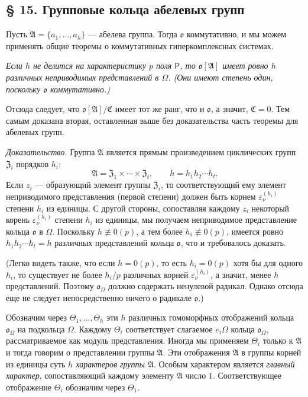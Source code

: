 \documentclass[11pt]{article}
\begin{document}
\subsection*{§ 15. Групповые кольца абелевых групп}\label{die-gruppenringe-abelscher-gruppen}

Пусть \(\mathfrak A=\{a_1,\ldots,a_h\}\) --- абелева группа. Тогда \(\mathfrak o\) коммутативно, и мы можем применять общие теоремы о коммутативных гиперкомплексных системах.

\emph{Если \(h\) не делится на характеристику \(p\) поля \(\mathsf P\), то \(\mathfrak o[\mathfrak A]\) имеет ровно \(h\) различных неприводимых представлений в \(\Omega\). (Они имеют степень один, поскольку \(\mathfrak o\) коммутативно.)}

Отсюда следует, что \(\mathfrak o[\mathfrak A]/\mathfrak C\) имеет тот же ранг, что и \(\mathfrak o\), а значит, \(\mathfrak C=0\). Тем самым доказана вторая, оставленная выше без доказательства часть теоремы для абелевых групп.

\emph{Доказательство.} Группа \(\mathfrak A\) является прямым произведением циклических групп \(\mathfrak Z_i\) порядков \(h_i\):
\[
\mathfrak A=\mathfrak Z_1\times\cdots\times\mathfrak Z_t,\qquad
h=h_1h_2\cdots h_t .
\]
Если \(z_i\) --- образующий элемент группы \(\mathfrak Z_i\), то соответствующий ему элемент неприводимого представления (первой степени) должен быть корнем \(\varepsilon_\nu^{(h_i)}\) степени \(h_i\) из единицы. С другой стороны, сопоставляя каждому \(z_i\) некоторый корень \(\varepsilon_\nu^{(h_i)}\) степени \(h_i\) из единицы, мы получаем неприводимое представление кольца \(\mathfrak o\) в \(\Omega\). Поскольку \(h\not\equiv0(p)\), а тем более \(h_i\not\equiv0(p)\), имеется ровно \(h_1h_2\cdots h_t=h\) различных представлений кольца \(\mathfrak o\), что и требовалось доказать.

(Легко видеть также, что если \(h=0(p)\), то есть \(h_i=0(p)\) хотя бы для одного \(h_i\), то существует не более \(h_i/p\) различных корней \(\varepsilon_\nu^{(h_i)}\), а значит, менее \(h\) представлений. Поэтому \(\mathfrak o_\Omega\) должно содержать ненулевой радикал. Однако отсюда еще не следует непосредственно ничего о радикале \(\mathfrak o\).)

Обозначим через \(\Theta_1,\ldots,\Theta_h\) эти \(h\) различных гомоморфных отображений кольца \(\mathfrak o_\Omega\) на подкольца \(\Omega\). Каждому \(\Theta_i\) соответствует слагаемое \(e_i\Omega\) кольца \(\mathfrak o_\Omega\), рассматриваемое как модуль представления. Иногда мы применяем \(\Theta_i\) только к \(\mathfrak A\) и тогда говорим о представлении группы \(\mathfrak A\). Эти отображения \(\mathfrak A\) в группы корней из единицы суть \emph{\(h\) характеров группы \(\mathfrak A\)}. Особым характером является \emph{главный характер}, сопоставляющий каждому элементу \(\mathfrak A\) число \(1\). Соответствующее отображение \(\Theta_i\) обозначим через \(\Theta_1\).
\end{document}
